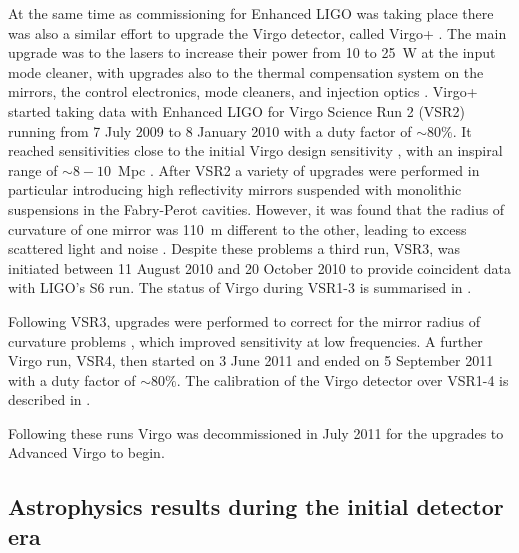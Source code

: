 At the same time as commissioning for Enhanced LIGO was taking place there was also a similar effort to 
upgrade the Virgo detector, called Virgo+ \cite{2011CQGra..28k4002A}. The main upgrade was to the lasers to 
increase their power from 10 to 25~W at the input mode cleaner, with upgrades also to the thermal compensation 
system on the mirrors, the control electronics, mode cleaners, and injection optics \cite{Acernese:2008b, 
AdvVirgoWhitepaper}. Virgo+ started taking data with Enhanced LIGO for Virgo Science Run 2 (VSR2) running from 
7 July 2009 to 8 January 2010 with a duty factor of $\sim 80\%$. It reached sensitivities close to the initial 
Virgo design sensitivity \cite{2012JInst...7.3012A}, with an inspiral range of $\sim 8-10$~Mpc 
\cite{VSR2paper}. After VSR2 a variety of upgrades were performed in particular introducing high reflectivity 
mirrors suspended with monolithic suspensions in the Fabry-Perot cavities. However, it was found that the 
radius of curvature of one mirror was 110~m different to the other, leading to excess scattered light and 
noise \cite{VSR2paper}. Despite these problems a third run, VSR3, was initiated between 11 August 2010 
and 20 October 2010 to provide coincident data with LIGO's S6 run. The status of Virgo during VSR1-3 is 
summarised in \cite{2012CQGra..29o5002A}.

Following VSR3, upgrades were performed to correct for the mirror radius of curvature problems 
\cite{VSR2paper}, which improved sensitivity at low frequencies. A further Virgo run, VSR4, then started on 3 
June 2011 and ended on 5 September 2011 with a duty factor of $\sim 80\%$. The calibration of the Virgo 
detector over VSR1-4 is described in \cite{2014CQGra..31p5013A}.

Following these runs Virgo was decommissioned in July 2011 for the upgrades to Advanced Virgo to begin.

\subsection{Astrophysics results during the initial detector era}
\label{subsection:results}

